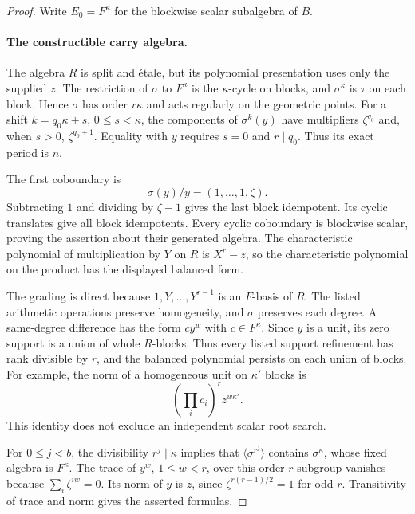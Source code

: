 \documentclass[11pt]{article}
\theoremstyle{definition}
\theoremstyle{remark}
\begin{document}
\begin{proof}
Write \(E_0=F^\kappa\) for the blockwise scalar subalgebra of \(B\).

\paragraph{The constructible carry algebra.}
The algebra \(R\) is split and \'{e}tale, but its polynomial
presentation uses only the supplied \(z\).
The restriction of \(\sigma\) to \(F^\kappa\) is the
\(\kappa\)-cycle on blocks, and
\(\sigma^\kappa\) is \(\tau\) on each block.
Hence \(\sigma\) has order \(r\kappa\) and acts regularly
on the geometric points.
For a shift \(k=q_0\kappa+s\), \(0\leq s<\kappa\),
the components of \(\sigma^k(y)\) have multipliers
\(\zeta^{q_0}\) and, when \(s>0\), \(\zeta^{q_0+1}\).
Equality with \(y\) requires \(s=0\) and \(r\mid q_0\).
Thus its exact period is \(n\).

The first coboundary is
\[
                       \sigma(y)/y=(1,\ldots,1,\zeta).
\]
Subtracting \(1\) and dividing by \(\zeta-1\) gives the last
block idempotent.  Its cyclic translates give all block idempotents.
Every cyclic coboundary is blockwise scalar, proving the
assertion about their generated algebra.
The characteristic polynomial of multiplication by \(Y\)
on \(R\) is \(X^r-z\), so the characteristic polynomial
on the product has the displayed balanced form.

The grading is direct because \(1,Y,\ldots,Y^{r-1}\) is
an \(F\)-basis of \(R\).
The listed arithmetic operations preserve homogeneity,
and \(\sigma\) preserves each degree.
A same-degree difference has the form \(c y^w\) with
\(c\in F^\kappa\).
Since \(y\) is a unit, its zero support is a union of
whole \(R\)-blocks.  Thus every listed support refinement
has rank divisible by \(r\), and the balanced polynomial
persists on each union of blocks.
For example, the norm of a homogeneous unit on \(\kappa'\)
blocks is
\[
                   \left(\prod_i c_i\right)^r z^{w\kappa'}.
\]
This identity does not exclude an independent scalar root search.

For \(0\leq j<b\), the divisibility \(r^j\mid\kappa\) implies
that \(\langle\sigma^{r^j}\rangle\) contains
\(\sigma^\kappa\), whose fixed algebra is \(F^\kappa\).
The trace of \(y^w\), \(1\leq w<r\), over this order-\(r\)
subgroup vanishes because \(\sum_i\zeta^{iw}=0\).
Its norm of \(y\) is \(z\), since
\(\zeta^{r(r-1)/2}=1\) for odd \(r\).
Transitivity of trace and norm gives the asserted formulas.


\end{proof}
\end{document}
